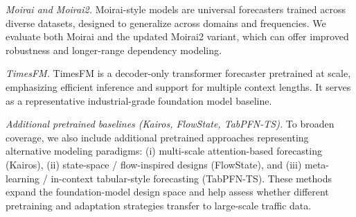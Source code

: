 \documentclass[10pt]{article}
\begin{document}
\textit{Moirai and Moirai2.}
Moirai-style models are universal forecasters trained across diverse datasets, designed to generalize across
domains and frequencies. We evaluate both Moirai and the updated Moirai2 variant, which can offer improved
robustness and longer-range dependency modeling.

\textit{TimesFM.}
TimesFM is a decoder-only transformer forecaster pretrained at scale, emphasizing efficient inference and
support for multiple context lengths. It serves as a representative industrial-grade foundation model baseline.

\textit{Additional pretrained baselines (Kairos, FlowState, TabPFN-TS).}
To broaden coverage, we also include additional pretrained approaches representing alternative modeling
paradigms: (i) multi-scale attention-based forecasting (Kairos), (ii) state-space / flow-inspired designs
(FlowState), and (iii) meta-learning / in-context tabular-style forecasting (TabPFN-TS). These methods expand
the foundation-model design space and help assess whether different pretraining and adaptation strategies
transfer to large-scale traffic data.
\end{document}
